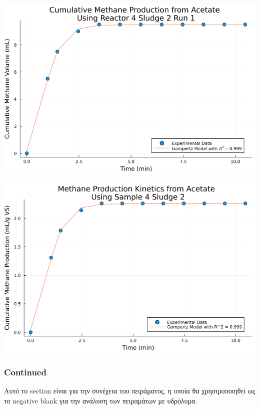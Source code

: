 \documentclass[11pt]{article}
\begin{document}
\begin{center}
\includegraphics[width=.9\linewidth]{../plots/BMPs/Acetate/methane_kinetics_acet_test_4_s2_min.png}
\end{center}

\begin{center}
\includegraphics[width=.9\linewidth]{../plots/BMPs/Acetate/specific_methane_kinetics_acet_test_4_s2.png}
\end{center}

\subsubsection{Continued}
\label{sec:org1d616d5}
Αυτό το section είναι για την συνέχεια του πειράματος, η οποία θα χρησιμοποιηθεί ως το negative blank για την ανάλυση των πειραμάτων με υδρόλυμα.
\end{document}
